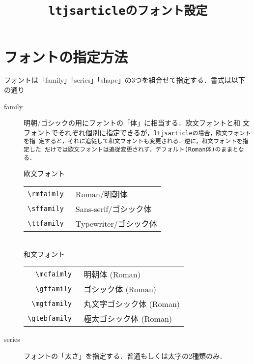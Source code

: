 \documentclass[12pt,a4paper]{ltjsarticle}
\title{\tt{ltjsarticle}のフォント設定}
\begin{document}
\maketitle
\section{フォントの指定方法}
\label{sec:font}
フォントは「family」「series」「shape」の3つを組合せて指定する．書式は以下の通り
\begin{description}
\item[family] 明朝/ゴシックの用にフォントの「体」に相当する．欧文フォントと和
  文フォントでそれぞれ個別に指定できるが，\tt{ltjsarticle}の場合，欧文フォントを指
  定すると，それに追従して和文フォントも変更される．逆に，和文フォントを指定した
  だけでは欧文フォントは追従変更されず，デフォルト(Roman体)のままとなる．
  \begin{table}[h]
    \centering
      欧文フォント\\
    \begin{tabular}{rl}
      \hline
      \tt{\textbackslash{}rmfaimly} & {\rmfamily Roman/明朝体}\\
      \tt{\textbackslash{}sffamily} & {\sffamily Sans-serif/ゴシック体}\\
      \tt{\textbackslash{}ttfamily} & {\ttfamily Typewriter/ゴシック体}\\
      \hline
    \end{tabular}\\
      和文フォント\\
    \begin{tabular}{rl}
      \hline
      \tt{\textbackslash{}mcfaimly} & {\mcfamily 明朝体 (Roman)}\\
      \tt{\textbackslash{}gtfamily} & {\gtfamily ゴシック体 (Roman)}\\
      \tt{\textbackslash{}mgtfamily} & {\mgfamily 丸文字ゴシック体 (Roman)}\\
      \tt{\textbackslash{}gtebfamily} & {\gtebfamily 極太ゴシック体 (Roman)}\\
      \hline
    \end{tabular}
  \end{table}
\item[series] フォントの「太さ」を指定する．普通もしくは太字の2種類のみ．
  \begin{table}[h]
    \centering
    \begin{tabular}{rl}
      \hline

\end{tabular}
\end{table}
\end{description}
\end{document}
